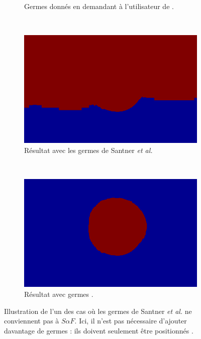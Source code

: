\begin{figure}[htb]
\begin{subfigure}[t]{0.4\textwidth}
\caption{Germes donnés en demandant à l'utilisateur de  .}
 \end{subfigure}
 \\
 \begin{subfigure}[t]{0.4\textwidth}	
\includegraphics[width=\textwidth]{images/evaluation/SeedsSantner/image_0217_9060_seeds_santner_res}
\caption{Résultat  avec les germes de Santner \textit{et al.}}
 \end{subfigure}
 ~
 \begin{subfigure}[t]{0.4\textwidth}	
\includegraphics[width=\textwidth]{images/evaluation/SeedsSantner/image_0217_9060_seeds_saf_res}
\caption{Résultat  avec  germes .}
 \end{subfigure}
\caption{Illustration de l'un des cas où les germes de Santner \textit{et al.} ne conviennent pas à $S \alpha F$. Ici, il n'est pas nécessaire d'ajouter davantage de germes : ils doivent seulement être positionnés . }
	\label{fig:eval:seedsSantner2}
\end{figure} 
